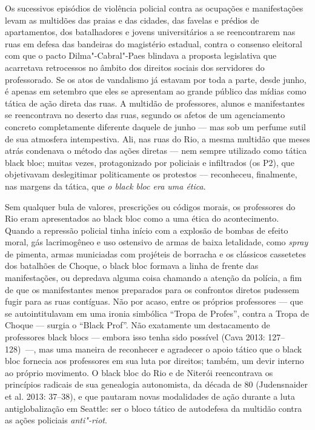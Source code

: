 Os sucessivos episódios de violência policial contra as ocupações e
manifestações levam as multidões das praias e das cidades, das favelas e
prédios de apartamentos, dos batalhadores e jovens universitários a se
reencontrarem nas ruas em defesa das bandeiras do magistério estadual,
contra o consenso eleitoral com que o pacto Dilma"-Cabral"-Paes blindava a
proposta legislativa que acarretava retrocessos no âmbito dos direitos
sociais dos servidores do professorado. Se os atos de vandalismo já
estavam por toda a parte, desde junho, é apenas em setembro que eles se
apresentam ao grande público das mídias como tática de ação direta das
ruas. A multidão de professores, alunos e manifestantes se reencontrava
no deserto das ruas, segundo os afetos de um agenciamento concreto
completamente diferente daquele de junho --- mas sob um perfume sutil de
sua atmosfera intempestiva. Ali, nas ruas do Rio, a mesma multidão que
meses atrás condenava o método das ações diretas --- nem sempre utilizado
como tática black bloc; muitas vezes, protagonizado por policiais e
infiltrados (os P2), que objetivavam deslegitimar politicamente os
protestos --- reconheceu, finalmente, nas margens da tática, que \emph{o
black bloc era uma ética}.

Sem qualquer bula de valores, prescrições ou códigos morais, os
professores do Rio eram apresentados ao black bloc como a uma ética do
acontecimento. Quando a repressão policial tinha início com a explosão
de bombas de efeito moral, gás lacrimogêneo e uso ostensivo de armas de
baixa letalidade, como \emph{spray }de pimenta, armas municiadas com
projéteis de borracha e os clássicos cassetetes dos batalhões de Choque,
o black bloc formava a linha de frente das manifestações, ou depredava
alguma coisa chamando a atenção da polícia, a fim de que os
manifestantes menos preparados para os confrontos diretos pudessem fugir
para as ruas contíguas. Não por acaso, entre os próprios professores ---
que se autointitulavam em uma ironia simbólica ``Tropa de Profes'',
contra a Tropa de Choque --- surgia o ``Black Prof''. Não exatamente um
destacamento de professores black blocs --- embora isso tenha sido
possível (Cava 2013: 127--128)~---, mas uma maneira de reconhecer e
agradecer o apoio tático que o black bloc fornecia aos professores em
sua luta por direitos; também, um devir interno ao próprio movimento. O
black bloc do Rio e de Niterói reencontrava os princípios radicais de
sua genealogia autonomista, da década de 80 (Judensnaider et al. 2013:
37--38), e que pautaram novas modalidades de ação durante a luta
antiglobalização em Seattle: ser o bloco tático de autodefesa da
multidão contra as ações policiais \emph{anti"-riot}.

